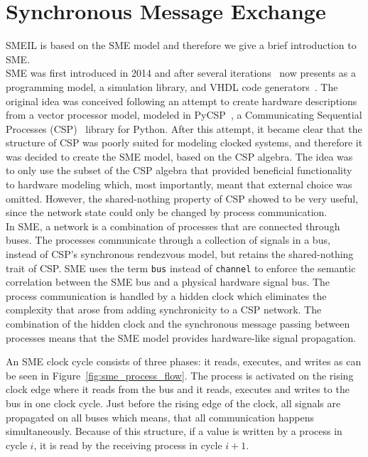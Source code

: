 \section{Synchronous Message Exchange}
SMEIL is based on the SME model and therefore we give a brief introduction to SME.
\\

SME was first introduced in 2014 and after several iterations~\cite{Vinter2014, Vinter2015, Skovhede} now presents as a programming model, a simulation library, and VHDL code generators~\cite{vhdl}. The original idea was conceived following an attempt to create hardware descriptions from a vector processor model, modeled in PyCSP~\cite{bjorndalen2007pycsp}, a Communicating
Sequential Processes (CSP)~\cite{hoare1978communicating} library for Python.
After this attempt, it became clear that the structure of CSP was poorly suited for modeling clocked systems, and therefore it was decided to create the SME model, based on the CSP algebra. The idea was to only use the subset of the CSP algebra that provided beneficial functionality to hardware modeling which, most importantly, meant that external choice was omitted. However, the shared-nothing property of CSP showed to be very useful, since the network state could only be changed by process communication.
\\

In SME, a network is a combination of processes that are connected through buses. The processes communicate through a collection of signals in a bus, instead of CSP's synchronous rendezvous model, but retains the shared-nothing trait of CSP.
SME uses the term \texttt{bus} instead of \texttt{channel} to enforce the semantic correlation between the SME bus and a physical hardware signal bus.
The process communication is handled by a hidden clock which eliminates the complexity that arose from adding synchronicity to a CSP network. The combination of the hidden clock and the synchronous message passing between processes means that the SME model provides hardware-like signal propagation.

An SME clock cycle consists of three phases: it reads, executes, and writes as can be seen in Figure~\ref{fig:sme_process_flow}. The process is activated on the rising clock edge where it reads from the bus and it reads, executes and writes to the bus in one clock cycle. Just before the rising edge of the clock, all signals are propagated on all buses which means, that all communication happens simultaneously. Because of this structure, if a value is written by a process in cycle $i$, it is read by the receiving process in cycle $i+1$.

